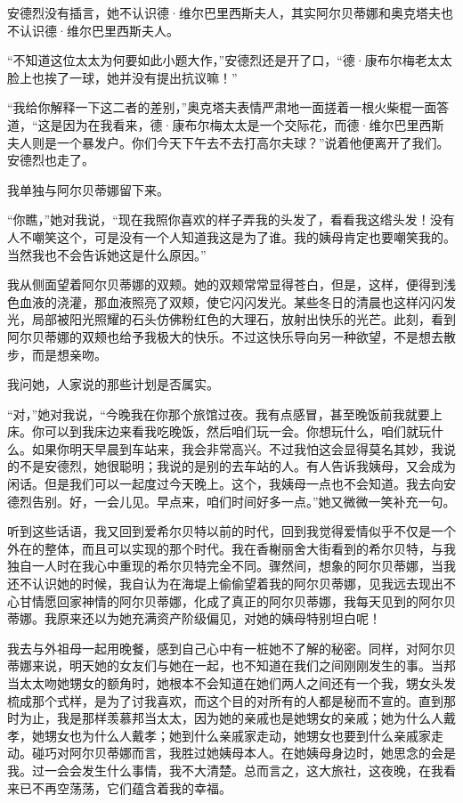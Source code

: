 \par 安德烈没有插言，她不认识德·维尔巴里西斯夫人，其实阿尔贝蒂娜和奥克塔夫也不认识德·维尔巴里西斯夫人。
\par “不知道这位太太为何要如此小题大作，”安德烈还是开了口，“德·康布尔梅老太太脸上也挨了一球，她并没有提出抗议嘛！”
\par “我给你解释一下这二者的差别，”奥克塔夫表情严肃地一面搓着一根火柴棍一面答道，“这是因为在我看来，德·康布尔梅太太是一个交际花，而德·维尔巴里西斯夫人则是一个暴发户。你们今天下午去不去打高尔夫球？”说着他便离开了我们。安德烈也走了。
\par 我单独与阿尔贝蒂娜留下来。
\par “你瞧，”她对我说，“现在我照你喜欢的样子弄我的头发了，看看我这绺头发！没有人不嘲笑这个，可是没有一个人知道我这是为了谁。我的姨母肯定也要嘲笑我的。当然我也不会告诉她这是什么原因。”
\par 我从侧面望着阿尔贝蒂娜的双颊。她的双颊常常显得苍白，但是，这样，便得到浅色血液的浇灌，那血液照亮了双颊，使它闪闪发光。某些冬日的清晨也这样闪闪发光，局部被阳光照耀的石头仿佛粉红色的大理石，放射出快乐的光芒。此刻，看到阿尔贝蒂娜的双颊也给予我极大的快乐。不过这快乐导向另一种欲望，不是想去散步，而是想亲吻。
\par 我问她，人家说的那些计划是否属实。
\par “对，”她对我说，“今晚我在你那个旅馆过夜。我有点感冒，甚至晚饭前我就要上床。你可以到我床边来看我吃晚饭，然后咱们玩一会。你想玩什么，咱们就玩什么。如果你明天早晨到车站来，我会非常高兴。不过我怕这会显得莫名其妙，我说的不是安德烈，她很聪明；我说的是别的去车站的人。有人告诉我姨母，又会成为闲话。但是我们可以一起度过今天晚上。这个，我姨母一点也不会知道。我去向安德烈告别。好，一会儿见。早点来，咱们时间好多一点。”她又微微一笑补充一句。
\par 听到这些话语，我又回到爱希尔贝特以前的时代，回到我觉得爱情似乎不仅是一个外在的整体，而且可以实现的那个时代。我在香榭丽舍大街看到的希尔贝特，与我独自一人时在我心中重现的希尔贝特完全不同。骤然间，想象的阿尔贝蒂娜，当我还不认识她的时候，我自认为在海堤上偷偷望着我的阿尔贝蒂娜，见我远去现出不心甘情愿回家神情的阿尔贝蒂娜，化成了真正的阿尔贝蒂娜，我每天见到的阿尔贝蒂娜。我原来还以为她充满资产阶级偏见，对她的姨母特别坦白呢！
\par 我去与外祖母一起用晚餐，感到自己心中有一桩她不了解的秘密。同样，对阿尔贝蒂娜来说，明天她的女友们与她在一起，也不知道在我们之间刚刚发生的事。当邦当太太吻她甥女的额角时，她根本不会知道在她们两人之间还有一个我，甥女头发梳成那个式样，是为了讨我喜欢，而这个目的对所有的人都是秘而不宣的。直到那时为止，我是那样羡慕邦当太太，因为她的亲戚也是她甥女的亲戚；她为什么人戴孝，她甥女也为什么人戴孝；她到什么亲戚家走动，她甥女也要到什么亲戚家走动。碰巧对阿尔贝蒂娜而言，我胜过她姨母本人。在她姨母身边时，她思念的会是我。过一会会发生什么事情，我不大清楚。总而言之，这大旅社，这夜晚，在我看来已不再空荡荡，它们蕴含着我的幸福。

